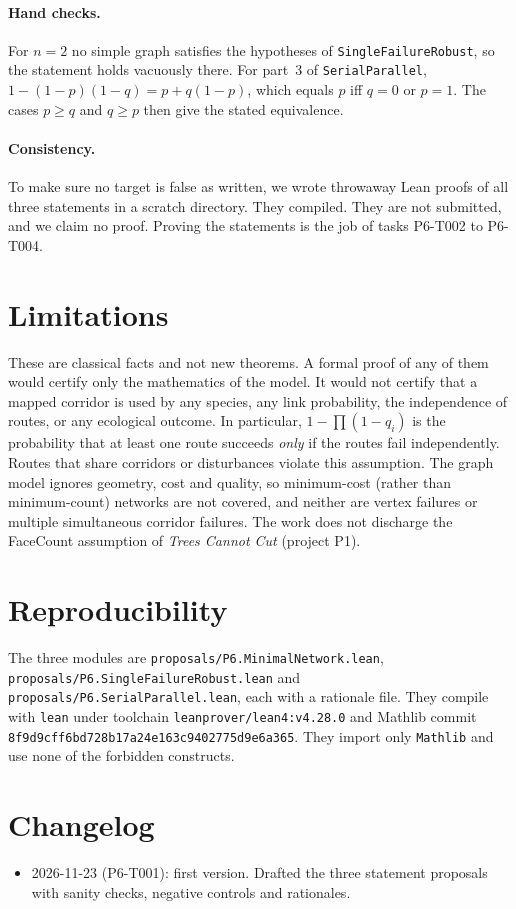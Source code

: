 \documentclass[11pt]{article}
\begin{document}
\paragraph{Hand checks.} For $n=2$ no simple graph satisfies the hypotheses of
\texttt{SingleFailureRobust}, so the statement holds vacuously there. For part~3 of
\texttt{SerialParallel}, $1-(1-p)(1-q)=p+q(1-p)$, which equals $p$ iff $q=0$ or $p=1$. The cases
$p\ge q$ and $q\ge p$ then give the stated equivalence.

\paragraph{Consistency.} To make sure no target is false as written, we wrote throwaway Lean proofs of all three
statements in a scratch directory. They compiled. They are not submitted, and we claim no proof. Proving the
statements is the job of tasks P6-T002 to P6-T004.

\section{Limitations}
These are classical facts and not new theorems. A formal proof of any of them would certify only the
mathematics of the model. It would not certify that a mapped corridor is used by any species, any link
probability, the independence of routes, or any ecological outcome. In particular,
$1-\prod(1-q_i)$ is the probability that at least one route succeeds \emph{only} if the routes fail
independently. Routes that share corridors or disturbances violate this assumption. The graph model ignores
geometry, cost and quality, so minimum-cost (rather than minimum-count) networks are not covered,
and neither are vertex failures or multiple simultaneous corridor failures. The work does not discharge the
FaceCount assumption of \emph{Trees Cannot Cut} (project P1).

\section{Reproducibility}
The three modules are \texttt{proposals/P6.MinimalNetwork.lean},
\texttt{proposals/P6.SingleFailureRobust.lean} and \texttt{proposals/P6.SerialParallel.lean}, each with a
rationale file. They compile with \texttt{lean} under toolchain \texttt{leanprover/lean4:v4.28.0} and
Mathlib commit \texttt{8f9d9cff6bd728b17a24e163c9402775d9e6a365}. They import only \texttt{Mathlib}
and use none of the forbidden constructs.

\section*{Changelog}
\begin{itemize}
\item 2026-11-23 (P6-T001): first version. Drafted the three statement proposals with sanity checks,
negative controls and rationales.
\end{itemize}



\end{document}
